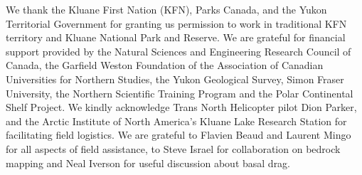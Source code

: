 \documentclass[draft,linenumbers]{agujournal}
\begin{document}
%
%
%
%
%
%
%


\acknowledgments
We thank the Kluane First Nation (KFN), Parks Canada, and the Yukon Territorial Government for granting us permission to work in traditional KFN territory and Kluane National Park and Reserve. We are grateful for financial support provided by the Natural Sciences and Engineering Research Council of Canada, the Garfield Weston Foundation of the Association of Canadian Universities for Northern Studies, the Yukon Geological Survey, Simon Fraser University, the Northern Scientific Training Program and the Polar Continental Shelf Project. We kindly acknowledge Trans North Helicopter pilot Dion Parker, and the Arctic Institute of North America's Kluane Lake Research Station for facilitating field logistics. We are grateful to Flavien Beaud and Laurent Mingo for all aspects of field assistance, to Steve Israel for collaboration on bedrock mapping and Neal Iverson for useful discussion about basal drag. 






\end{document}
